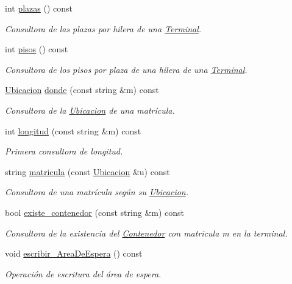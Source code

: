 \begin{DoxyCompactItemize}
int \hyperlink{class_terminal_a06602e79ec9e7bca40d73d7a6c436fe3}{plazas} () const
\begin{DoxyCompactList}\small\item\em Consultora de las plazas por hilera de una \hyperlink{class_terminal}{Terminal}. \end{DoxyCompactList}\item 
int \hyperlink{class_terminal_ae6e79d13bb240d038142256552ae0ec9}{pisos} () const
\begin{DoxyCompactList}\small\item\em Consultora de los pisos por plaza de una hilera de una \hyperlink{class_terminal}{Terminal}. \end{DoxyCompactList}\item 
\hyperlink{class_ubicacion}{Ubicacion} \hyperlink{class_terminal_a2847cb58fe61bb488f089bc67a1973fe}{donde} (const string \&m) const
\begin{DoxyCompactList}\small\item\em Consultora de la \hyperlink{class_ubicacion}{Ubicacion} de una matrícula. \end{DoxyCompactList}\item 
int \hyperlink{class_terminal_afc6d0f22bcc642c6ac4355e0b02a7d79}{longitud} (const string \&m) const
\begin{DoxyCompactList}\small\item\em Primera consultora de longitud. \end{DoxyCompactList}\item 
string \hyperlink{class_terminal_a674811a7b56f57ff5b447d10565e923b}{matricula} (const \hyperlink{class_ubicacion}{Ubicacion} \&u) const
\begin{DoxyCompactList}\small\item\em Consultora de una matrícula según su \hyperlink{class_ubicacion}{Ubicacion}. \end{DoxyCompactList}\item 
bool \hyperlink{class_terminal_a6b2cb1486f78ef82f759fb071bb1049d}{existe\+\_\+contenedor} (const string \&m) const
\begin{DoxyCompactList}\small\item\em Consultora de la existencia del \hyperlink{class_contenedor}{Contenedor} con matricula {\itshape m} en la terminal. \end{DoxyCompactList}\item 
void \hyperlink{class_terminal_a3da2635443b21d89e5fecc47153a888f}{escribir\+\_\+\+Area\+De\+Espera} () const
\begin{DoxyCompactList}\small\item\em Operación de escritura del área de espera. \end{DoxyCompactList}\item 

\end{DoxyCompactItemize}
